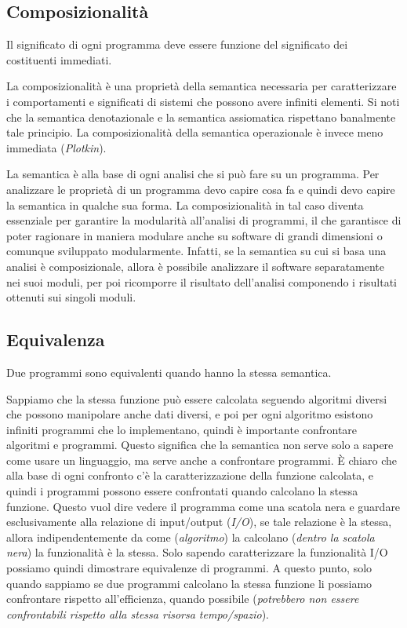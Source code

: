 \documentclass[oneside,a4paper,11pt]{book}
\theoremstyle{italicstyle}
\theoremstyle{normStyle}
\begin{document}
\subsection{Composizionalità}
\begin{tcolorbox}[title={Composizionalità}]
Il significato di ogni programma deve essere funzione del significato dei
costituenti immediati.
\end{tcolorbox}
La composizionalità è una proprietà della semantica necessaria per caratterizzare
i comportamenti e significati di sistemi che possono avere infiniti elementi.
Si noti che la semantica denotazionale e la semantica assiomatica rispettano banalmente
tale principio. La composizionalità della semantica operazionale è invece meno
immediata (\textit{Plotkin}). 

La semantica è alla base di ogni analisi che si può fare su un programma.
Per analizzare le proprietà di un programma devo capire cosa fa e quindi devo
capire la semantica in qualche sua forma. La composizionalità in tal caso diventa
essenziale per garantire la modularità all’analisi di programmi, il che
garantisce di poter ragionare in maniera modulare anche su software di grandi 
dimensioni o comunque sviluppato modularmente. Infatti, se la semantica su
cui si basa una analisi è composizionale, allora è possibile analizzare
il software separatamente nei suoi moduli, per poi ricomporre il risultato
dell’analisi componendo i risultati ottenuti sui singoli moduli.
\subsection{Equivalenza}
\begin{tcolorbox}[title={Equivalenza}]
Due programmi sono equivalenti quando hanno la stessa semantica.
\end{tcolorbox}
Sappiamo che la stessa funzione può essere calcolata seguendo
algoritmi diversi che possono manipolare anche dati diversi, e
poi per ogni algoritmo esistono infiniti programmi che lo implementano,
quindi è importante confrontare algoritmi e programmi. Questo significa
che la semantica non serve solo a sapere come usare un linguaggio,
ma serve anche a confrontare programmi.  È chiaro che alla base di
ogni confronto c’è la caratterizzazione della funzione calcolata, e
quindi i programmi possono essere confrontati quando calcolano la
stessa funzione. Questo vuol dire vedere il programma come una scatola
nera e guardare esclusivamente alla relazione di input/output (\textit{I/O}),
se tale relazione è la stessa, allora indipendentemente da come (\textit{algoritmo})
la calcolano (\textit{dentro la scatola nera}) la funzionalità è la stessa.
Solo sapendo caratterizzare la funzionalità I/O possiamo quindi
dimostrare equivalenze di programmi. A questo punto, solo quando
sappiamo se due programmi calcolano la stessa funzione li possiamo
confrontare rispetto all’efficienza, quando possibile (\textit{potrebbero non essere confrontabili
rispetto alla stessa risorsa tempo/spazio}).
\end{document}
